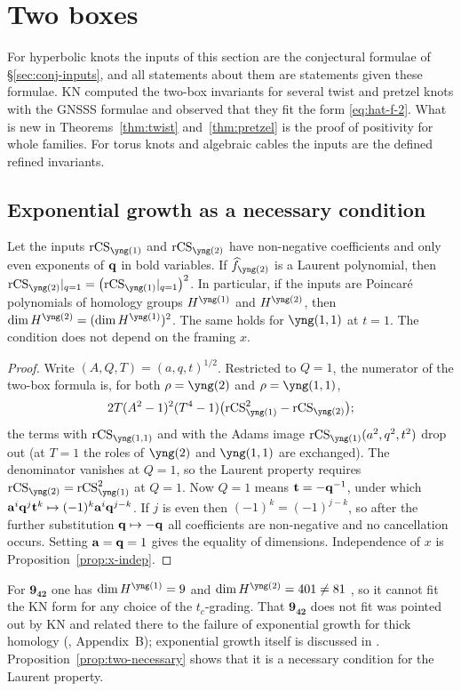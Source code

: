\section{Two boxes}\label{sec:two}

For hyperbolic knots the inputs of this section are the conjectural formulae of \S\ref{sec:conj-inputs}, and all statements about them are statements given these formulae.
KN \cite{Kameyama17} computed the two-box invariants for several twist and pretzel knots with the GNSSS formulae and observed that they fit the form \eqref{eq:hat-f-2}.
What is new in Theorems~\ref{thm:twist} and~\ref{thm:pretzel} is the proof of positivity for whole families.
For torus knots and algebraic cables the inputs are the defined refined invariants.

\subsection{Exponential growth as a necessary condition}
\begin{proposition}\label{prop:two-necessary}
Let the inputs $\rCS_{\yng(1)}$ and $\rCS_{\yng(2)}$ have non-negative coefficients and only even exponents of $\mathbf{q}$ in bold variables.
If $\hf_{\yng(2)}$ is a Laurent polynomial, then $\rCS_{\yng(2)}|_{q=1}=\bigl(\rCS_{\yng(1)}|_{q=1}\bigr)^2$.
In particular, if the inputs are Poincar\'e polynomials of homology groups $H^{\yng(1)}$ and $H^{\yng(2)}$, then $\dim H^{\yng(2)}=(\dim H^{\yng(1)})^2$.
The same holds for $\yng(1,1)$ at $t=1$. The condition does not depend on the framing $x$.
\end{proposition}
\begin{proof}
Write $(A,Q,T)=(a,q,t)^{1/2}$. Restricted to $Q=1$, the numerator of the two-box formula is, for both $\rho=\yng(2)$ and $\rho=\yng(1,1)$,
\[
2T(A^2-1)^2(T^4-1)\bigl(\rCS_{\yng(1)}^2-\rCS_{\yng(2)}\bigr);
\]
the terms with $\rCS_{\yng(1,1)}$ and with the Adams image $\rCS_{\yng(1)}(a^2,q^2,t^2)$ drop out (at $T=1$ the roles of $\yng(2)$ and $\yng(1,1)$ are exchanged).
The denominator vanishes at $Q=1$, so the Laurent property requires $\rCS_{\yng(2)}=\rCS_{\yng(1)}^2$ at $Q=1$.
Now $Q=1$ means $\mathbf{t}=-\mathbf{q}^{-1}$, under which $\mathbf{a}^i\mathbf{q}^j\mathbf{t}^k\mapsto(-1)^k\mathbf{a}^i\mathbf{q}^{j-k}$.
If $j$ is even then $(-1)^k=(-1)^{j-k}$, so after the further substitution $\mathbf{q}\mapsto-\mathbf{q}$ all coefficients are non-negative and no cancellation occurs.
Setting $\mathbf{a}=\mathbf{q}=1$ gives the equality of dimensions. Independence of $x$ is Proposition~\ref{prop:x-indep}.
\end{proof}
For $\mathbf{9_{42}}$ one has $\dim H^{\yng(1)}=9$ and $\dim H^{\yng(2)}=401\neq81$ \cite{Gorsky13}, so it cannot fit the KN form for any choice of the $t_c$-grading.
That $\mathbf{9_{42}}$ does not fit was pointed out by KN and related there to the failure of exponential growth for thick homology (\cite{Gukov11}, Appendix~B);
exponential growth itself is discussed in \cite{Gukov11,Fuji12}.
Proposition~\ref{prop:two-necessary} shows that it is a necessary condition for the Laurent property.

